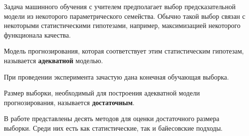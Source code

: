 Задача машинного обучения с учителем предполагает выбор предсказательной модели из некоторого параметрического семейства. Обычно такой выбор связан с некоторыми статистическими гипотезами, например, максимизацией некоторого функционала качества. 
\begin{definition}
    Модель прогнозирования, которая соответствует этим статистическим гипотезам, называется \textbf{адекватной} моделью.
\end{definition}

При проведении эксперимента зачастую дана конечная обучающая выборка.

\begin{definition}
    Размер выборки, необходимый для построения адекватной модели прогнозирования, называется \textbf{достаточным}.
\end{definition}

В работе \cite{Grabovoy2022} представлены десять методов для оценки достаточного размера выборки. Среди них есть как статистические, так и байесовские подходы. 